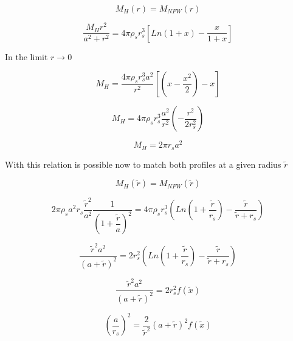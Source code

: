 \begin{equation}
M_H(r) = M_{NFW}(r)
\end{equation}

\begin{equation}
\frac{M_H r^2}{a^2 + r^2} = 4 \pi \rho_s r_s^3 \left[ Ln(1 + x) - \frac{x}{1+x}  \right]
\end{equation}

In the limit $r \rightarrow 0$

\begin{equation}
M_H = \dfrac{4 \pi \rho_s r_s^3 a^2}{r^2} \left[ (x - \dfrac{x^2}{2}) - x  \right]
\end{equation}

\begin{equation}
M_H = 4 \pi \rho_s r_s^3 \dfrac{a^2}{r^2} \left(  - \dfrac{r^2}{2r_s^2} \right)
\end{equation}

\begin{equation}
M_H = 2 \pi r_s a^2
\end{equation}

With this relation is possible now to match both profiles at a given radius $\tilde{r}$

\begin{equation}
M_H(\tilde{r}) = M_{NFW}(\tilde{r}) 
\end{equation}

\begin{equation}
2 \pi \rho_s a^2 r_s \dfrac{\tilde{r}^2}{a^2} \dfrac{1}{\left( 1 + \dfrac{\tilde{r}}{a}\right)^2} = 4 \pi \rho_s r_s^3 \left( Ln \left(1 + \dfrac{\tilde{r}}{r_s} \right)  - \dfrac{\tilde{r}}{\tilde{r} + r_s} \right)
\end{equation}

\begin{equation}
\dfrac{\tilde{r}^2 a^2}{(a + \tilde{r})^2} = 2 r_s^2 \left( Ln \left (1 +  \dfrac{\tilde{r}}{r_s} \right)  - \dfrac{\tilde{r}}{\tilde{r} + r_s}   \right)
\end{equation}


\begin{equation}
\dfrac{\tilde{r}^2 a^2}{(a + \tilde{r})^2} = 2 r_s^2 f(\tilde{x})
\end{equation}

\begin{equation}
\left( \frac{a}{r_s} \right)^2 = \dfrac{2}{\tilde{r}^2} (a + \tilde{r})^2 f(\tilde{x})
\end{equation}




